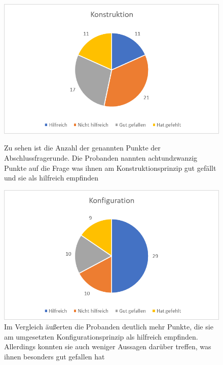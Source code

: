 \begin{figure}
   \begin{minipage}[b]{.49\linewidth} %
      \includegraphics[width=\linewidth]{pictures/diagramme/aussagenkonstr}
      \caption{Zu sehen ist die Anzahl der genannten Punkte der Abschlussfragerunde. Die Probanden nannten achtundzwanzig Punkte auf die Frage was ihnen am Konstruktionsprinzip gut gefällt und sie als hilfreich empfinden}
      \label{konstrabsch}
   \end{minipage}
   \hspace{.01\linewidth}%
   \begin{minipage}[b]{.49\linewidth} %
      \includegraphics[width=\linewidth]{pictures/diagramme/aussagenkonfig}
      \caption{Im Vergleich äußerten die Probanden deutlich mehr Punkte, die sie am umgesetzten Konfigurationsprinzip als hilfreich empfinden. Allerdings konnten sie auch weniger Aussagen darüber treffen, was ihnen besonders gut gefallen hat}
      \label{konfigabsch}
   \end{minipage}
\end{figure}



